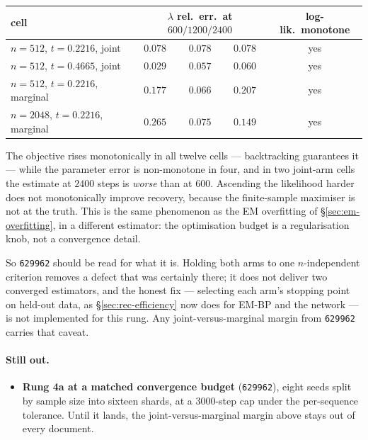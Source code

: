 \begin{center}\small
\begin{tabular}{lccc c}
\toprule
cell & \multicolumn{3}{c}{$\lambda$ rel.\ err.\ at $600 / 1200 / 2400$} & log-lik.\ monotone \\
\midrule
$n{=}512$, $t{=}0.2216$, joint    & $0.078$ & $0.078$ & $0.078$ & yes \\
$n{=}512$, $t{=}0.4665$, joint    & $0.029$ & $0.057$ & $0.060$ & yes \\
$n{=}512$, $t{=}0.2216$, marginal & $0.177$ & $0.066$ & $0.207$ & yes \\
$n{=}2048$, $t{=}0.2216$, marginal& $0.265$ & $0.075$ & $0.149$ & yes \\
\bottomrule
\end{tabular}
\end{center}

\noindent The objective rises monotonically in all twelve cells --- backtracking guarantees it ---
while the parameter error is non-monotone in four, and in two joint-arm cells the estimate at $2400$
steps is \emph{worse} than at $600$. Ascending the likelihood harder does not monotonically improve
recovery, because the finite-sample maximiser is not at the truth. This is the same phenomenon as
the EM overfitting of \S\ref{sec:em-overfitting}, in a different estimator: the optimisation budget
is a regularisation knob, not a convergence detail.

So \texttt{629962} should be read for what it is. Holding both arms to one $n$-independent
criterion removes a defect that was certainly there; it does not deliver two converged estimators,
and the honest fix --- selecting each arm's stopping point on held-out data, as
\S\ref{sec:rec-efficiency} now does for EM-BP and the network --- is not implemented for this rung.
Any joint-versus-marginal margin from \texttt{629962} carries that caveat.

\paragraph{Still out.}
\begin{itemize}\itemsep3pt
\item \textbf{Rung 4a at a matched convergence budget} (\texttt{629962}), eight seeds split by
      sample size into sixteen shards, at a $3000$-step cap under the per-sequence tolerance. Until
      it lands, the joint-versus-marginal margin above stays out of every document.
\end{itemize}

